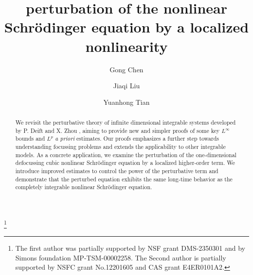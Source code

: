 \documentclass{amsart}
\theoremstyle{plain}
\theoremstyle{remark}
\numberwithin{equation}{section}
\begin{document}
	\title{perturbation of the nonlinear Schr\"odinger equation
 by a localized nonlinearity}
	\author{Gong Chen}
	\author{Jiaqi Liu}
	\author{Yuanhong Tian}
\address[Chen]{School of Mathematics, Georgia institute of technology. 686 Cherry Street, Skiles Building, Atlanta GA 30332-0160}
\address[Liu]{School of mathematics, University of Chinese Academy of Sciences. No.19 Yuquan Road, Beijing China }
\address[Tian]{School of mathematics, University of Chinese Academy of Sciences. No.19 Yuquan Road, Beijing China}
\thanks{The first author was partially supported by NSF grant DMS-2350301 and by Simons foundation MP-TSM-00002258. The Second author is partially supported by NSFC grant No.12201605 and CAS grant E4ER0101A2.}
\begin{abstract}
We revisit the perturbative theory of infinite dimensional integrable systems developed by P. Deift and X. Zhou \cite{DZ-2}, aiming to provide  new and simpler proofs of some  key $L^\infty$ bounds and  $L^p$ \emph{\textit{a priori}} estimates. Our proofs emphasizes a further step towards understanding focussing problems and extends the applicability  to other integrable models. As a concrete application, we examine the perturbation of the one-dimensional defocussing cubic nonlinear Schr\"odinger equation by a localized higher-order term. We introduce improved estimates to control the power of the perturbative term and demonstrate that the perturbed equation exhibits the same long-time behavior as the completely integrable nonlinear Schr\"odinger equation.

  
\end{abstract}
\end{document}
